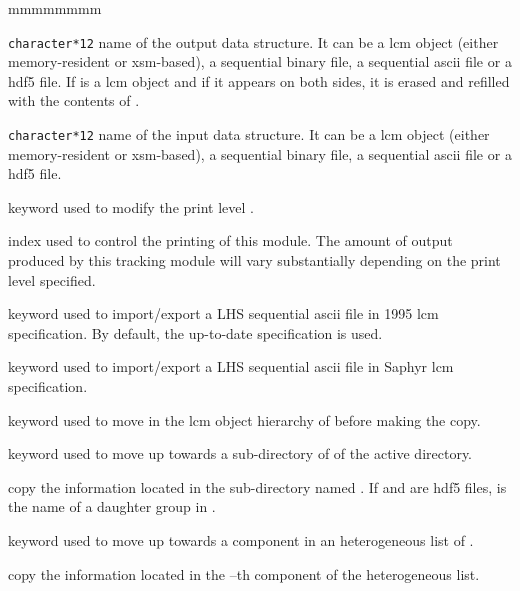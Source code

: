 \begin{ListeDeDescription}{mmmmmmmm}

\item[\dusa{NAME1}] {\tt character*12} name of the output data
structure. It can be a {\sc lcm} object (either memory-resident or {\sc xsm}-based), a sequential binary file,
a sequential {\sc ascii} file or a {\sc hdf5} file. If  is a {\sc lcm} object and if it appears on both sides,
it is erased and refilled with the contents of .

\item[\dusa{NAME2}] {\tt character*12} name of the input data
structure. It can be a {\sc lcm} object (either memory-resident or {\sc xsm}-based), a sequential binary file,
a sequential {\sc ascii} file or a {\sc hdf5} file.

\item[\moc{EDIT}] keyword used to modify the print level .

\item[\dusa{iprint}] index used to control the printing of this module. The
amount of output produced by this tracking module will vary substantially
depending on the print level specified.

\item[\moc{OLD}] keyword used to import/export a LHS sequential {\sc ascii} file in 1995 {\sc lcm} specification. By
default, the up-to-date specification is used.

\item[\moc{SAP}] keyword used to import/export a LHS sequential {\sc ascii} file in Saphyr {\sc lcm} specification.

\item[\moc{STEP}] keyword used to move in the {\sc lcm} object hierarchy of  before making the copy.

\item[\moc{UP}] keyword used to move up towards a sub-directory of  of the
active directory.

\item[\dusa{NOMDIR}] copy the information located in the sub-directory named . If  and  are
{\sc hdf5} files,  is the name of a daughter group in .

\item[\moc{AT}] keyword used to move up towards a component in an heterogeneous list of .

\item[\dusa{index}] copy the information located in the --th component of the heterogeneous list.

\end{ListeDeDescription}

